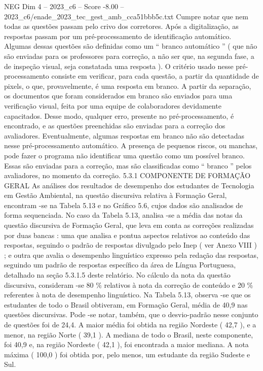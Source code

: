 \begin{textsample}{NEG Dim 4 – 2023\_c6 – Score -8.00 – 2023\_c6/enade\_2023\_tec\_gest\_amb\_cca51bbb5c.txt}
Cumpre notar que nem todas as questões passam pelo crivo dos corretores.
Após a digitalização, as respostas passam por um pré-processamento de identificação automático.
Algumas dessas questões são definidas como um “ branco automático ” ( que não são enviadas para os professores para correção, a não ser que, na segunda fase, a de inspeção visual, seja constatada uma resposta ).
O critério usado nesse pré-processamento consiste em verificar, para cada questão, a partir da quantidade de pixels, o que, provavelmente, é uma resposta em branco.
A partir da separação, os documentos que foram considerados em branco são enviados para uma verificação visual, feita por uma equipe de colaboradores devidamente capacitados.
Desse modo, qualquer erro, presente no pré-processamento, é encontrado, e as questões preenchidas são enviadas para a correção dos avaliadores.
Eventualmente, algumas respostas em branco não são detectadas nesse pré-processamento automático.
A presença de pequenos riscos, ou manchas, pode fazer o programa não identificar uma questão como um possível branco.
Essas são enviadas para a correção, mas são classificadas como “ branco ” pelos avaliadores, no momento da correção. 5.3.1 COMPONENTE DE FORMAÇÃO GERAL As análises dos resultados de desempenho dos estudantes de Tecnologia em Gestão Ambiental, na questão discursiva relativa à Formação Geral, encontram -se na Tabela 5.13 e no Gráfico 5.6, cujos dados são analisados de forma sequenciada.
No caso da Tabela 5.13, analisa -se a média das notas da questão discursiva de Formação Geral, que leva em conta as correções realizadas por duas bancas : uma que analisa e pontua aspectos relativos ao conteúdo das respostas, seguindo o padrão de respostas divulgado pelo Inep ( ver Anexo VIII ) ; e outra que avalia o desempenho linguístico expresso pela redação das respostas, seguindo um padrão de respostas específico da área de Língua Portuguesa, detalhado na seção 5.3.1.5 deste relatório.
No cálculo da nota da questão discursiva, consideram -se 80 \% relativos à nota da correção de conteúdo e 20 \% referentes à nota de desempenho linguístico.
Na Tabela 5.13, observa -se que os estudantes de todo o Brasil obtiveram, em Formação Geral, média de 40,9 nas questões discursivas.
Pode -se notar, também, que o desvio-padrão nesse conjunto de questões foi de 24,4.
A maior média foi obtida na região Nordeste ( 42,7 ), e a menor, na região Norte ( 39,1 ).
A mediana de todo o Brasil, neste componente, foi 40,9 e, na região Nordeste ( 42,1 ), foi encontrada a maior mediana.
A nota máxima ( 100,0 ) foi obtida por, pelo menos, um estudante da região Sudeste e Sul.

\end{textsample}

